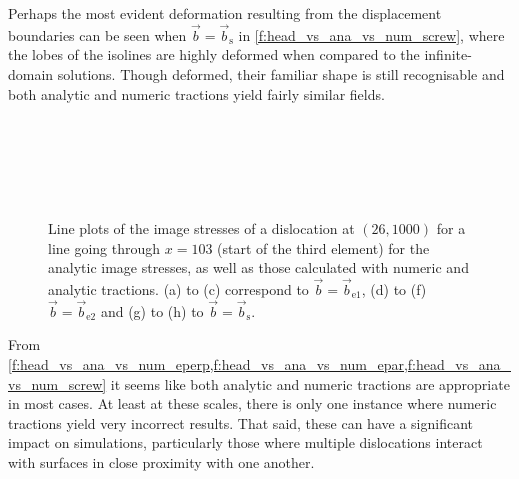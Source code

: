 Perhaps the most evident deformation resulting from the displacement boundaries can be seen when $\vec{b} = \vec{b}_{\textrm{s}}$ in \cref{f:head_vs_ana_vs_num_screw}, where the lobes of the isolines are highly deformed when compared to the infinite-domain solutions. Though deformed, their familiar shape is still recognisable and both analytic and numeric tractions yield fairly similar fields.

\begin{figure}
    \centering
    ~
    ~

    ~
    ~

    ~
    \caption[Line plots of the infinite domain, analytic and traction image stresses.]{Line plots of the image stresses of a dislocation at $(26, 1000)$ for a line going through $x = 103$ (start of the third element) for the analytic image stresses, as well as those calculated with numeric and analytic tractions. (a) to (c) correspond to $\vec{b} = \vec{b}_{\textrm{e1}}$, (d) to (f) $\vec{b} = \vec{b}_{\textrm{e2}}$ and (g) to (h) to $\vec{b} = \vec{b}_{\textrm{s}}$.}
    \label{f:line_head_vs_ana_vs_num}
\end{figure}
From \cref{f:head_vs_ana_vs_num_eperp,f:head_vs_ana_vs_num_epar,f:head_vs_ana_vs_num_screw} it seems like both analytic and numeric tractions are appropriate in most cases. At least at these scales, there is only one instance where numeric tractions yield very incorrect results. That said, these can have a significant impact on simulations, particularly those where multiple dislocations interact with surfaces in close proximity with one another.


